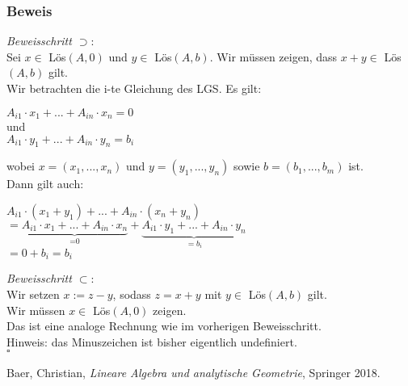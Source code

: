 \documentclass{article}
\begin{document}
\subsubsection*{Beweis}
\textit{Beweisschritt $\supset$}: \\
Sei $x \in$ Lös$(A,0)$ und $y \in$ Lös$(A,b)$.
Wir müssen zeigen, dass $x+y \in$ Lös$(A,b)$ gilt. \\
Wir betrachten die i-te Gleichung des LGS. Es gilt: \\
\begin{center}
    $A_{i1} \cdot x_1 + ... + A_{in} \cdot x_n = 0$ \\
    und \\
    $A_{i1} \cdot y_1 + ... + A_{in} \cdot y_n = b_i$
\end{center}
wobei $x=(x_1, ..., x_n)$ und $y=(y_1, ..., y_n)$ sowie $b=(b_1, ..., b_m)$ ist. \\
Dann gilt auch: \\
\begin{center}
    $A_{i1} \cdot (x_1 + y_1) + ... + A_{in} \cdot (x_n + y_n)$ \\
    $= \underbrace{A_{i1} \cdot x_1 + ... + A_{in} \cdot x_n}_{\text{=0}} + \underbrace{A_{i1} \cdot y_1 + ... + A_{in} \cdot y_n}_{\text{$=b_i$}}$ \\   
    $= 0 + b_i = b_i$
\end{center}
\textit{Beweisschritt $\subset$}: \\
Wir setzen $x:=z-y$, sodass $z=x+y$ mit $y \in $ Lös$(A,b)$ gilt. \\
Wir müssen $x \in$ Lös$(A,0)$ zeigen. \\
Das ist eine analoge Rechnung wie im vorherigen Beweisschritt. \\
Hinweis: das Minuszeichen ist bisher eigentlich undefiniert. \\
$\square$ \\


\begin{thebibliography}{9}
    Baer, Christian,
    \emph{Lineare Algebra und analytische Geometrie},
    Springer 2018.
    \end{thebibliography}
\end{document}
